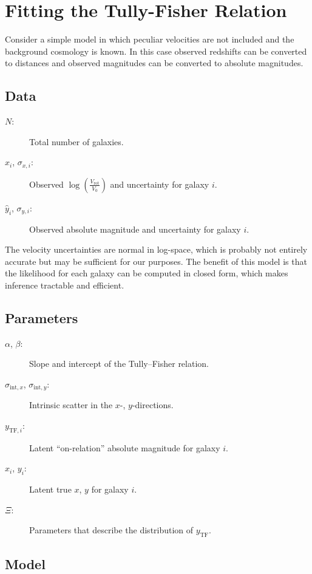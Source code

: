 \section{Fitting the Tully-Fisher Relation}
\label{sec:likelihood}
Consider a simple model in which peculiar velocities are not included and the background cosmology is known.
In this case observed redshifts can be converted to distances and observed magnitudes can be converted to absolute magnitudes.

\subsection{Data}
\begin{description}
    \item[$N$:] Total number of galaxies.
    \item[$\hat x_i$, $\sigma_{x,i}$:] Observed $\log\!\left(\frac{V_{\text{rot}}}{V_0}\right)$ and uncertainty for galaxy $i$.
    \item[$\hat y_i$, $\sigma_{y,i}$:] Observed absolute magnitude and uncertainty for galaxy $i$.
\end{description}
The velocity uncertainties are normal in log-space, which is probably not entirely accurate but may be sufficient for our purposes.
The benefit of this model is that the likelihood for each galaxy can be computed in closed form, which makes inference tractable and efficient.

\subsection{Parameters}
\begin{description}
    \item[$\alpha$, $\beta$:] Slope and intercept of the Tully--Fisher relation.
    \item[$\sigma_{\text{int},x}$, $\sigma_{\text{int},y}$:] Intrinsic scatter in the $x$-, $y$-directions.
    \item[$y_{\text{TF},i}$:] Latent ``on-relation'' absolute magnitude for galaxy $i$.
    \item[$x_i$, $y_i$:] Latent true $x$, $y$ for galaxy $i$.
    \item[$\Xi$:] Parameters that describe the distribution of $y_{\text{TF}}$.
\end{description}

\subsection{Model}
\label{sec:app1:model}

